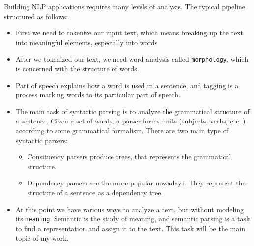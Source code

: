 Building NLP applications requires many levels of analysis.
The typical pipeline structured as follows:
\begin{itemize}
	\item First we need to tokenize our input text, which means breaking up the text into meaningful elements, especially into words
    \item After we tokenized our text, we need word analysis called \texttt{morphology}, which is concerned with the structure of words.
    \item Part of speech explains how a word is used in a sentence, and tagging is a process marking words to its particular part of speech.
    \item The main task of syntactic parsing is to analyze the grammatical structure of a sentence. Given a set of words, a parser forms units (subjects, verbs, etc..) according to some grammatical formalism.
    There are two main type of syntactic parsers:
    \begin{itemize}
        \item Consituency parsers produce trees, that represents the grammatical structure.
        \item Dependency parsers are the more popular nowadays. They represent the structure of a sentence as a dependency tree.
    \end{itemize}
    \item At this point we have various ways to analyze a text, but without modeling its \texttt{meaning}. Semantic is the study of meaning, and semantic parsing is a task to find a representation and assign it to the text. This task will be the main topic of my work.
\end{itemize}

